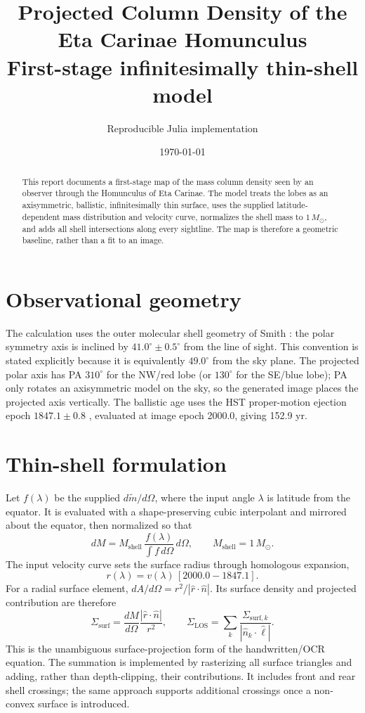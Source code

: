 \documentclass[11pt,a4paper]{article}
\title{\textcolor{TSLRed}{Projected Column Density of the Eta Carinae Homunculus}\\\large First-stage infinitesimally thin-shell model}
\author{Reproducible Julia implementation}
\date{\today}
\begin{document}
\maketitle

\begin{abstract}
This report documents a first-stage map of the mass column density seen by an observer through the Homunculus of Eta Carinae. The model treats the lobes as an axisymmetric, ballistic, infinitesimally thin surface, uses the supplied latitude-dependent mass distribution and velocity curve, normalizes the shell mass to $1\,M_\odot$, and adds all shell intersections along every sightline. The map is therefore a geometric baseline, rather than a fit to an image.
\end{abstract}

\section{Observational geometry}
The calculation uses the outer molecular shell geometry of Smith \cite{smith2006}: the polar symmetry axis is inclined by $41.0^\circ\pm0.5^\circ$ from the line of sight. This convention is stated explicitly because it is equivalently $49.0^\circ$ from the sky plane. The projected polar axis has PA $310^\circ$ for the NW/red lobe (or $130^\circ$ for the SE/blue lobe); PA only rotates an axisymmetric model on the sky, so the generated image places the projected axis vertically. The ballistic age uses the HST proper-motion ejection epoch $1847.1\pm0.8$ \cite{smith2017}, evaluated at image epoch 2000.0, giving 152.9 yr.

\section{Thin-shell formulation}
Let $f(\lambda)$ be the supplied $d\tilde m/d\Omega$, where the input angle $\lambda$ is latitude from the equator. It is evaluated with a shape-preserving cubic interpolant and mirrored about the equator, then normalized so that
\begin{equation}
 dM = M_\mathrm{shell}\,\frac{f(\lambda)}{\int f\,d\Omega}\,d\Omega,
 \qquad M_\mathrm{shell}=1\,M_\odot.
\end{equation}
The input velocity curve sets the surface radius through homologous expansion,
\begin{equation}
 r(\lambda)=v(\lambda)\,[2000.0-1847.1].
\end{equation}
For a radial surface element, $dA/d\Omega=r^2/|\hat{r}\cdot\hat n|$. Its surface density and projected contribution are therefore
\begin{equation}
 \Sigma_\mathrm{surf}=\frac{dM}{d\Omega}\frac{|\hat r\cdot\hat n|}{r^2},
 \qquad
 \Sigma_\mathrm{LOS}=\sum_k\frac{\Sigma_{\mathrm{surf},k}}{|\hat n_k\cdot\hat\ell|}.
\end{equation}
This is the unambiguous surface-projection form of the handwritten/OCR equation. The summation is implemented by rasterizing all surface triangles and adding, rather than depth-clipping, their contributions. It includes front and rear shell crossings; the same approach supports additional crossings once a non-convex surface is introduced.
\end{document}
